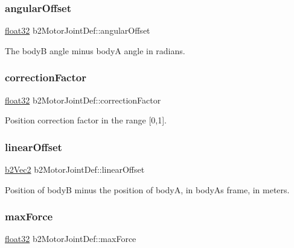 \subsubsection{\texorpdfstring{angularOffset}{angularOffset}}
{\footnotesize\ttfamily \mbox{\hyperlink{b2_settings_8h_aacdc525d6f7bddb3ae95d5c311bd06a1}{float32}} b2\+Motor\+Joint\+Def\+::angular\+Offset}



The bodyB angle minus bodyA angle in radians. 

\mbox{\label{structb2_motor_joint_def_ab282afdb92d07ead23530f57fd0eb9ea}} 
\subsubsection{\texorpdfstring{correctionFactor}{correctionFactor}}
{\footnotesize\ttfamily \mbox{\hyperlink{b2_settings_8h_aacdc525d6f7bddb3ae95d5c311bd06a1}{float32}} b2\+Motor\+Joint\+Def\+::correction\+Factor}



Position correction factor in the range \mbox{[}0,1\mbox{]}. 

\mbox{\label{structb2_motor_joint_def_a2c957cffc2af66c6c8077c069b906bc4}} 
\subsubsection{\texorpdfstring{linearOffset}{linearOffset}}
{\footnotesize\ttfamily \mbox{\hyperlink{structb2_vec2}{b2\+Vec2}} b2\+Motor\+Joint\+Def\+::linear\+Offset}



Position of bodyB minus the position of bodyA, in bodyA\textquotesingle{}s frame, in meters. 

\mbox{\label{structb2_motor_joint_def_a2f66d1b99c654e112dc68e15375d5ee7}} 
\subsubsection{\texorpdfstring{maxForce}{maxForce}}
{\footnotesize\ttfamily \mbox{\hyperlink{b2_settings_8h_aacdc525d6f7bddb3ae95d5c311bd06a1}{float32}} b2\+Motor\+Joint\+Def\+::max\+Force}



